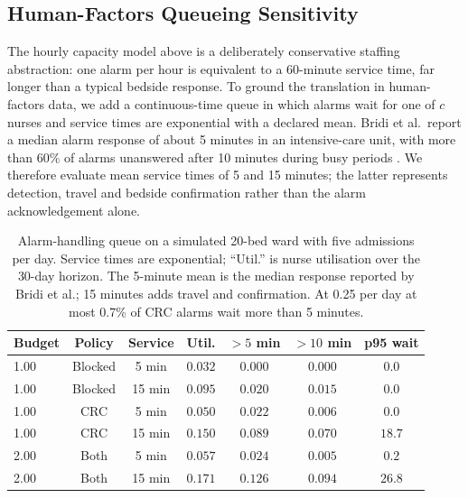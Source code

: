 \subsection{Human-Factors Queueing Sensitivity}
\label{sec:queue}

The hourly capacity model above is a deliberately conservative staffing abstraction: one alarm per hour is equivalent to a 60-minute service time, far longer than a typical bedside response. To ground the translation in human-factors data, we add a continuous-time queue in which alarms wait for one of $c$ nurses and service times are exponential with a declared mean. Bridi et al.\ report a median alarm response of about 5 minutes in an intensive-care unit, with more than 60\% of alarms unanswered after 10 minutes during busy periods \citep{bridi2014reaction}. We therefore evaluate mean service times of 5 and 15 minutes; the latter represents detection, travel and bedside confirmation rather than the alarm acknowledgement alone.

\begin{table}[H]
\centering
\caption{Alarm-handling queue on a simulated 20-bed ward with five admissions per day. Service times are exponential; ``Util.'' is nurse utilisation over the 30-day horizon. The 5-minute mean is the median response reported by Bridi et al.; 15 minutes adds travel and confirmation. At 0.25 per day at most 0.7\% of CRC alarms wait more than 5 minutes.}
\label{tab:queue}
\small
\begin{tabular}{lcccccc}
\toprule
Budget & Policy & Service & Util. & $>5$ min & $>10$ min & p95 wait \\
\midrule
1.00 & Blocked & 5 min & $0.032$ & $0.000$ & $0.000$ & $0.0$ \\
1.00 & Blocked & 15 min & $0.095$ & $0.020$ & $0.015$ & $0.0$ \\
1.00 & CRC & 5 min & $0.050$ & $0.022$ & $0.006$ & $0.0$ \\
1.00 & CRC & 15 min & $0.150$ & $0.089$ & $0.070$ & $18.7$ \\
2.00 & Both & 5 min & $0.057$ & $0.024$ & $0.005$ & $0.2$ \\
2.00 & Both & 15 min & $0.171$ & $0.126$ & $0.094$ & $26.8$ \\
\bottomrule
\end{tabular}
\end{table}


